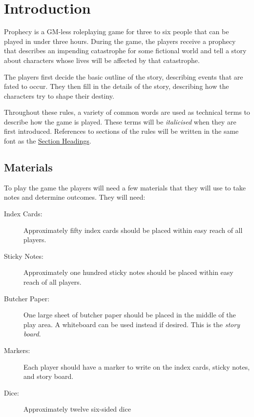 \documentclass[11pt, a5paper, parskip=half-, DIV=12]{scrartcl}
\newcommand{\futura}{\setmainfont{Futura}}
\begin{document}
\setcounter{page}{1}
\setmainfont{TeX Gyre Schola}
\normalsize
\raggedright
\section*{Introduction} \label{section:introduction}
Prophecy is a GM-less roleplaying game for three to six people that can be played in under three hours.
During the game, the players receive a prophecy that describes an impending catastrophe for some fictional world and tell a story about characters whose lives will be affected by that catastrophe. 

The players first decide the basic outline of the story, describing events that are fated to occur. 
 They then fill in the details of the story, describing how the characters try to shape their destiny.

Throughout these rules, a variety of common words are used as technical terms to describe how the game is played.
These terms will be \emph{italicised} when they are first introduced.
References to sections of the rules will be written in the same font as the \hyperref[section:introduction]{\futura Section Headings}.

\subsection*{Materials} \label{subsection:materials}
To play the game the players will need a few materials that they will use to take notes and determine outcomes.
They will need:
\begin{description}
	\item[Index Cards:] Approximately fifty index cards should be placed within easy reach of all players. 
	\item[Sticky Notes:] Approximately one hundred sticky notes should be placed within easy reach of all players.
	\item[Butcher Paper:] One large sheet of butcher paper should be placed in the middle of the play area.  A whiteboard can be used instead if desired. This is the \emph{story board}.
	\item[Markers:] Each player should have a marker to write on the index cards, sticky notes, and story board.
	\item[Dice:] Approximately twelve six-sided dice%
\end{description}

\newpage
\ClearShipoutPicture
{}
\end{document}
